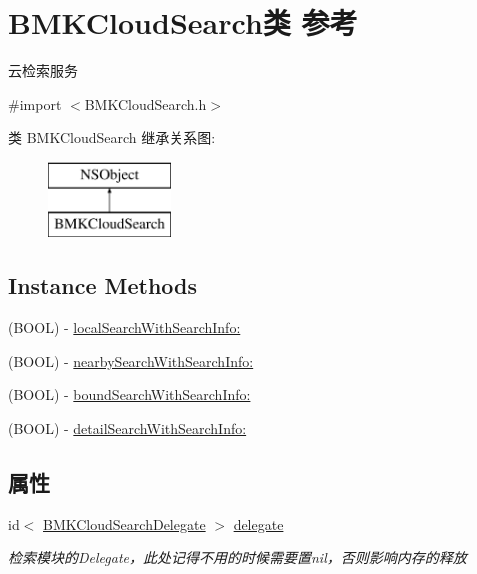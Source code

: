 \hypertarget{interface_b_m_k_cloud_search}{}\section{B\+M\+K\+Cloud\+Search类 参考}
\label{interface_b_m_k_cloud_search}


云检索服务  




{\ttfamily \#import $<$B\+M\+K\+Cloud\+Search.\+h$>$}

类 B\+M\+K\+Cloud\+Search 继承关系图\+:\begin{figure}[H]
\begin{center}
\leavevmode
\includegraphics[height=2.000000cm]{interface_b_m_k_cloud_search}
\end{center}
\end{figure}
\subsection*{Instance Methods}
\begin{DoxyCompactItemize}
\item 
(B\+O\+O\+L) -\/ \hyperlink{interface_b_m_k_cloud_search_a473c4aeff275be5840ac6cf8010ce1d8}{local\+Search\+With\+Search\+Info\+:}
\item 
(B\+O\+O\+L) -\/ \hyperlink{interface_b_m_k_cloud_search_abe65e1b2f2b67e1d081c697caae80e4b}{nearby\+Search\+With\+Search\+Info\+:}
\item 
(B\+O\+O\+L) -\/ \hyperlink{interface_b_m_k_cloud_search_a7b2a5b409e884fb240e94f42cbad5208}{bound\+Search\+With\+Search\+Info\+:}
\item 
(B\+O\+O\+L) -\/ \hyperlink{interface_b_m_k_cloud_search_aaa7dcb1e49edd705290a3e79d8d22e92}{detail\+Search\+With\+Search\+Info\+:}
\end{DoxyCompactItemize}
\subsection*{属性}
\begin{DoxyCompactItemize}
\item 
\hypertarget{interface_b_m_k_cloud_search_ac35ac10ba735ab371814e2d69c27af23}{}id$<$ \hyperlink{protocol_b_m_k_cloud_search_delegate-p}{B\+M\+K\+Cloud\+Search\+Delegate} $>$ \hyperlink{interface_b_m_k_cloud_search_ac35ac10ba735ab371814e2d69c27af23}{delegate}\label{interface_b_m_k_cloud_search_ac35ac10ba735ab371814e2d69c27af23}

\begin{DoxyCompactList}\small\item\em 检索模块的\+Delegate，此处记得不用的时候需要置nil，否则影响内存的释放 \end{DoxyCompactList}\end{DoxyCompactItemize}


